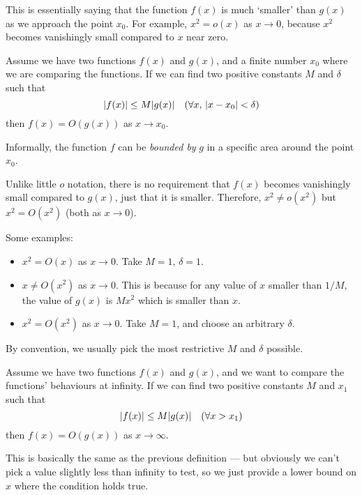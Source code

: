\documentclass{article}
\begin{document}
This is essentially saying that the function $f(x)$ is much `smaller' than $g(x)$ as we approach the point $x_0$. For example, $x^2 = o(x)$ as $x \to 0$, because $x^2$ becomes vanishingly small compared to $x$ near zero.

\begin{definition}
	Assume we have two functions $f(x)$ and $g(x)$, and a finite number $x_0$ where we are comparing the functions. If we can find two positive constants $M$ and $\delta$ such that
	\begin{equation}
		\abs{f(x)} \leq M\abs{g(x)} \quad(\forall x,\, \abs{x-x_0} < \delta)
	\end{equation}
	then $f(x) = O(g(x))$ as $x \to x_0$.
\end{definition}
Informally, the function $f$ can be \textit{bounded by} $g$ in a specific area around the point $x_0$.

Unlike little $o$ notation, there is no requirement that $f(x)$ becomes vanishingly small compared to $g(x)$, just that it is smaller. Therefore, $x^2 \neq o(x^2)$ but $x^2 = O(x^2)$ (both as $x \to 0$).

Some examples:
\begin{itemize}
	\item $x^2 = O(x)$ as $x \to 0$. Take $M = 1$, $\delta = 1$.
	\item $x \neq O(x^2)$ as $x \to 0$. This is because for any value of $x$ smaller than $1/M$, the value of $g(x)$ is $Mx^2$ which is smaller than $x$.
	\item $x^2 = O(x^2)$ as $x \to 0$. Take $M = 1$, and choose an arbitrary $\delta$.
\end{itemize}

By convention, we usually pick the most restrictive $M$ and $\delta$ possible.

\begin{definition}
	Assume we have two functions $f(x)$ and $g(x)$, and we want to compare the functions' behaviours at infinity. If we can find two positive constants $M$ and $x_1$ such that
	\begin{equation}\label{bigoinf}
		\abs{f(x)} \leq M\abs{g(x)} \quad(\forall x > x_1)
	\end{equation}
	then $f(x) = O(g(x))$ as $x \to \infty$.
\end{definition}

This is basically the same as the previous definition --- but obviously we can't pick a value slightly less than infinity to test, so we just provide a lower bound on $x$ where the condition holds true.
\end{document}
